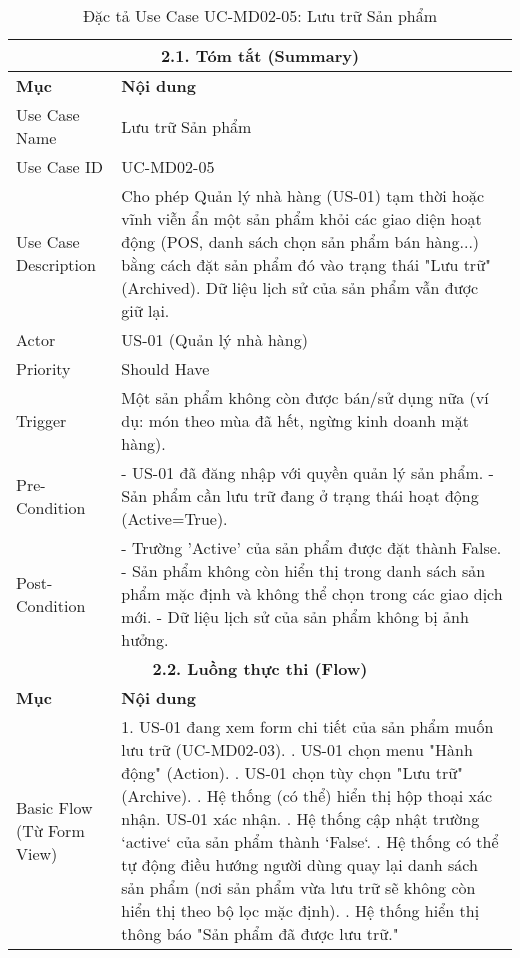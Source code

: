 \begin{longtable}{|m{4cm}|p{11cm}|}
\caption{Đặc tả Use Case UC-MD02-05: Lưu trữ Sản phẩm} \label{tab:uc_md02_05_revised} \\
\hline
\multicolumn{2}{|c|}{\textbf{2.1. Tóm tắt (Summary)}} \\
\hline
\textbf{Mục} & \textbf{Nội dung} \\
\hline
\endhead %
\hline
\endfoot %
\hline
\endlastfoot %
Use Case Name & Lưu trữ Sản phẩm \\
\hline
Use Case ID & UC-MD02-05 \\
\hline
Use Case Description & Cho phép Quản lý nhà hàng (US-01) tạm thời hoặc vĩnh viễn ẩn một sản phẩm khỏi các giao diện hoạt động (POS, danh sách chọn sản phẩm bán hàng...) bằng cách đặt sản phẩm đó vào trạng thái "Lưu trữ" (Archived). Dữ liệu lịch sử của sản phẩm vẫn được giữ lại. \\
\hline
Actor & US-01 (Quản lý nhà hàng) \\
\hline
Priority & Should Have \\
\hline
Trigger & Một sản phẩm không còn được bán/sử dụng nữa (ví dụ: món theo mùa đã hết, ngừng kinh doanh mặt hàng). \\
\hline
Pre-Condition & - US-01 đã đăng nhập với quyền quản lý sản phẩm. \newline - Sản phẩm cần lưu trữ đang ở trạng thái hoạt động (Active=True). \\
\hline
Post-Condition & - Trường 'Active' của sản phẩm được đặt thành False. \newline - Sản phẩm không còn hiển thị trong danh sách sản phẩm mặc định và không thể chọn trong các giao dịch mới. \newline - Dữ liệu lịch sử của sản phẩm không bị ảnh hưởng. \\
\hline
\multicolumn{2}{|c|}{\textbf{2.2. Luồng thực thi (Flow)}} \\
\hline
\textbf{Mục} & \textbf{Nội dung} \\
\hline
Basic Flow (Từ Form View) & 1. US-01 đang xem form chi tiết của sản phẩm muốn lưu trữ (UC-MD02-03). \newline 2. US-01 chọn menu "Hành động" (Action). \newline 3. US-01 chọn tùy chọn "Lưu trữ" (Archive). \newline 4. Hệ thống (có thể) hiển thị hộp thoại xác nhận. US-01 xác nhận. \newline 5. Hệ thống cập nhật trường `active` của sản phẩm thành `False`. \newline 6. Hệ thống có thể tự động điều hướng người dùng quay lại danh sách sản phẩm (nơi sản phẩm vừa lưu trữ sẽ không còn hiển thị theo bộ lọc mặc định). \newline 7. Hệ thống hiển thị thông báo "Sản phẩm đã được lưu trữ." \\

\end{longtable}
